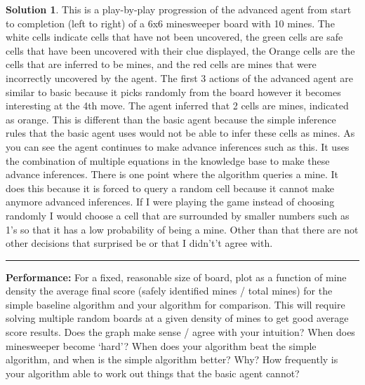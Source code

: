 \documentclass{article}
\theoremstyle{definition}
\def\fline{\rule{0.75\linewidth}{0.5pt}}
\newcommand{\finishline}{\vspace{-15pt}\begin{center}\fline\end{center}}
\newtheorem*{solution*}{Solution}
\newenvironment{solution}{\begin{solution*}}{{\finishline} \end{solution*}}
\begin{document}
\begin{solution}
	This is a play-by-play progression of the advanced agent from start to completion (left to right) of a 6x6 minesweeper board with 10 mines. The white cells indicate cells that have not been uncovered, the green cells are safe cells that have been uncovered with their clue displayed, the Orange cells are the cells that are inferred to be mines, and the red cells are mines that were incorrectly uncovered by the agent. The first 3 actions of the advanced agent are similar to basic because it picks randomly from the board however it becomes interesting at the 4th move. The agent inferred that 2 cells are mines, indicated as orange. This is different than the basic agent because the simple inference rules that the basic agent uses would not be able to infer these cells as mines. As you can see the agent continues to make advance inferences such as this. It uses the combination of multiple equations in the knowledge base to make these advance inferences. 
    There is one point where the algorithm queries a mine. It does this because it is forced to query a random cell because it cannot make anymore advanced inferences. If I were playing the game instead of choosing randomly I would choose a cell that are surrounded by smaller numbers such as 1’s so that it has a low probability of being a mine. Other than that there are not other decisions that surprised be or that I didn't’t agree with.

\end{solution}

\smallskip

\textbf{Performance: }
For a fixed, reasonable size of board, plot as a function of mine density the average final score (safely identified mines / total mines) for the simple baseline algorithm and your algorithm for comparison. This will require solving multiple random boards at a given density of mines to get good average score results.
Does the graph make sense / agree with your intuition? When does minesweeper become ‘hard’?
When does your algorithm beat the simple algorithm, and when is the simple algorithm better? Why?
How frequently is your algorithm able to work out things that the basic agent cannot? 

\smallskip
\end{document}
